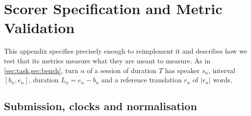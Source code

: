 \section{Scorer Specification and Metric Validation}\label{app:scorer}

This appendix specifies \scorer precisely enough to reimplement it and describes how we test that its metrics measure what they are meant to measure. As in \cref{sec:task,sec:bench}, turn $n$ of a session of duration $T$ has speaker $s_n$, interval $[b_n,e_n]$, duration $L_n=e_n-b_n$ and a reference translation $r_n$ of $|r_n|$ words.

\subsection{Submission, clocks and normalisation}


